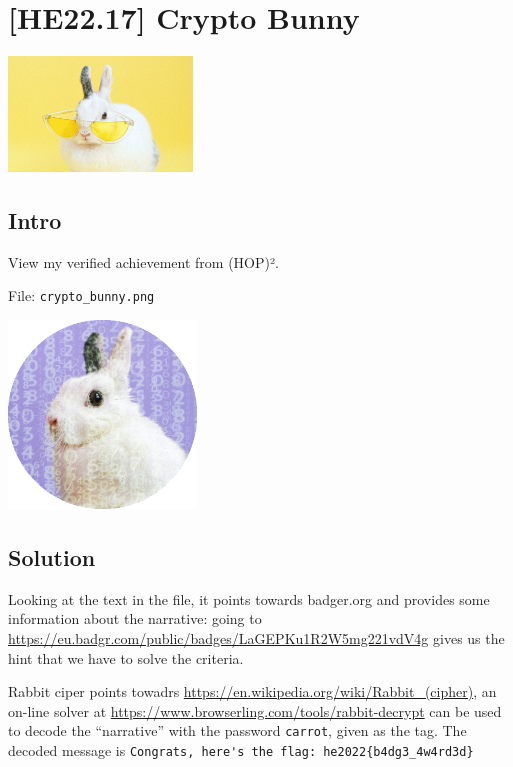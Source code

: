 
\hypertarget{he22.17}{%
\chapter{[HE22.17] Crypto Bunny}\label{he22.17}}

\begin{marginfigure}
	\includegraphics[width=49mm]{level5/challenge17.jpg}
\end{marginfigure}
\section{Intro}
View my verified achievement from (HOP)².

File: \verb+crypto_bunny.png+
\begin{marginfigure}
	\includegraphics[width=50mm]{level5/crypto_bunny.png}
\end{marginfigure}
\section{Solution}\label{hv22.17solution}
Looking at the text in the file, it points towards badger.org and provides some information about the narrative:
going to \url{https://eu.badgr.com/public/badges/LaGEPKu1R2W5mg221vdV4g} gives us the hint that we have to solve the criteria.  

Rabbit ciper points towadrs \url{https://en.wikipedia.org/wiki/Rabbit_(cipher)}, an on-line solver at \url{https://www.browserling.com/tools/rabbit-decrypt} can be used to decode the ``narrative'' with the password \verb+carrot+, given as the tag.  The decoded message is \verb+Congrats, here's the flag: he2022{b4dg3_4w4rd3d}+

	









